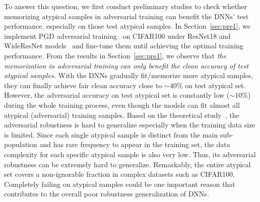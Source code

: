 To answer this question, we first conduct preliminary studies to check whether memorizing atypical samples in adversarial training can benefit the DNNs' test performance, especially on those test atypical samples. In Section~\ref{sec:pre1}, we implement PGD adversarial training~\cite{madry2017towards} on CIFAR100 under ResNet18 and WideResNet models~\cite{he2016deep} and fine-tune them until achieving the optimal training performance.
From the results in Section~\ref{sec:pre1}, we observe that {\it the memorization in adversarial training can only benefit the clean accuracy of test atypical samples.} With the DNNs gradually fit/memorize more atypical samples, they can finally achieve fair clean accuracy close to $\sim40\%$ on test atypical set.
However, the adversarial accuracy on test atypical set is constantly low ($\sim10\%$) during the whole training process, even though the models can fit almost all atypical (adversarial) training samples. Based on the theoretical study~\cite{schmidt2018adversarially}, the adversarial robustness is hard to generalize especially when the training data size is limited. Since each single atypical sample is distinct from the main sub-population and has rare frequency to appear in the training set, the data complexity for each specific atypical sample is also very low. Thus, its adversarial robustness can be extremely hard to generalize. Remarkably, the entire atypical set covers a non-ignorable fraction in complex datasets such as CIFAR100. Completely failing on atypical samples could be one important reason that contributes to the overall poor robustness generalization of DNNs. 


